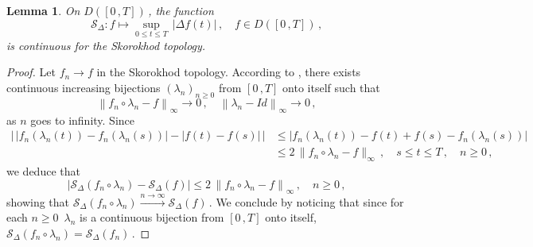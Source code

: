 \documentclass{article}
\newcommand{\1}{\mathbbm{1}}
\newtheorem{lemma}[theorem]{Lemma}
\numberwithin{equation}{section}
\begin{document}
\begin{lemma}
\label{lemma:functionals_continuity}
On $D([0\,,T])\,$, the function 
$$
\mathcal S_{\Delta} : f \mapsto \sup_{0 \leq t \leq T}\, |\Delta f(t)|\,, \quad f \in D([0\,,T])\,,
$$
is continuous for the Skorokhod topology.
\end{lemma}
\begin{proof}
    Let $f_n \to f$ in the Skorokhod topology. According to \citet[Theorem~VI.1.14]{jacod2013limit}, there exists continuous increasing bijections $\left(\lambda_n\right)_{n \geq 0}$ from $[0\,,T]$ onto itself such that 
    $$
    \left\| f_n \circ \lambda_n - f\right\|_{\infty} \to 0\,, \quad \left\| \lambda_n - Id \right\|_{\infty} \to 0\,,
    $$
    as $n$ goes to infinity. Since
    \begin{align*}
        \left|\,|f_n(\lambda_n(t)) - f_n(\lambda_n(s))| - |f(t) - f(s) | \,\right| &\leq |f_n(\lambda_n(t)) - f(t) + f(s) - f_n(\lambda_n(s))| \\
        &\leq 2\,\|f_n \circ \lambda_n - f\|_{\infty}\,, \quad s \leq t \leq T\,, \quad n \geq 0\,,
    \end{align*}
    we deduce that 
    $$
    \left|\mathcal S_{\Delta}(f_n \circ \lambda_n) - \mathcal S_{\Delta}(f) \right| \leq 2\,\left\|f_n \circ \lambda_n - f\right\|_{\infty}\,, \quad n \geq 0\,,
    $$
    showing that $\mathcal S_{\Delta} (f_n \circ \lambda_n) \overset{n \to \infty}{\longrightarrow} \mathcal S_{\Delta}(f)\,$. We conclude by noticing that since for each $n \geq 0\,$ $\lambda_n$ is a continuous bijection from $[0\,,T]$ onto itself, $\mathcal S_{\Delta} (f_n \circ \lambda_n) = \mathcal S_{\Delta}(f_n)\,$.
\end{proof}
\end{document}
